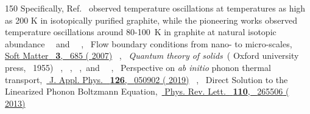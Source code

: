 \documentclass[
prb,
twocolumn,
superscriptaddress,
 amsmath,amssymb,
 aps,
longbibliography,
]{revtex4-2}
\begin{document}
\begin{thebibliography}{150}
  \BibitemOpen
   {Specifically, Ref.~\cite {Ding2022} observed temperature oscillations at temperatures as high as 200 K in isotopically purified graphite, while the pioneering works \cite {Huberman2019,Jeong2021} observed temperature oscillations around 80-100~K in graphite at natural isotopic abundance}
  \BibitemOpen
   { {~}\ and\  {\ },\ } { {Flow boundary conditions from nano- to micro-scales},\ }\href {https://doi.org/10.1039/b616490k} { { {Soft Matter}\ }\textbf { {3}},\  {685} ( {2007})}
  \BibitemOpen
   { {\ },\ }\href@noop {} {\emph { {{Quantum theory of solids}}}}\ ( {Oxford university press},\  {1955})
  \BibitemOpen
   { {~},  {~},  {~},\ and\  {~},\ } { {Perspective on \textit{ab initio} phonon thermal transport},\ }\href {http://aip.scitation.org/doi/10.1063/1.5108651} { { {J. Appl. Phys.}\ }\textbf { {126}},\  {050902} ( {2019})}
  \BibitemOpen
   { {~},\ } { {Direct {Solution} to the {Linearized} {Phonon} {Boltzmann} {Equation}},\ }\href {https://link.aps.org/doi/10.1103/PhysRevLett.110.265506} { { {Phys. Rev. Lett.}\ }\textbf { {110}},\  {265506} ( {2013})}

\end{thebibliography}
\end{document}
